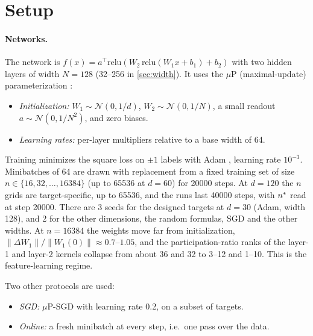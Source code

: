 \section{Setup}\label{sec:setup}

\paragraph{Networks.} The network is $f(x)=a^\top\mathrm{relu}(W_2\,\mathrm{relu}(W_1x+b_1)+b_2)$ with two hidden layers of width $N=128$ (32–256 in \cref{sec:width}). It uses the $\mu$P (maximal-update) parameterization \cite{yang2021feature}:
\begin{itemize}
\item \emph{Initialization:} $W_1\sim\mathcal N(0,1/d)$, $W_2\sim\mathcal N(0,1/N)$, a small readout $a\sim\mathcal N(0,1/N^2)$, and zero biases.
\item \emph{Learning rates:} per-layer multipliers relative to a base width of 64.
\end{itemize}
Training minimizes the square loss on $\pm1$ labels with Adam \cite{kingma2015adam}, learning rate $10^{-3}$. Minibatches of 64 are drawn with replacement from a fixed training set of size $n\in\{16,32,\dots,16384\}$ (up to 65536 at $d=60$) for 20000 steps. At $d=120$ the $n$ grids are target-specific, up to 65536, and the runs last 40000 steps, with $n^{*}$ read at step 20000. There are 3 seeds for the designed targets at $d=30$ (Adam, width 128), and 2 for the other dimensions, the random formulas, SGD and the other widths. At $n=16384$ the weights move far from initialization, $\|\Delta W_1\|/\|W_1(0)\|\approx0.7$–$1.05$, and the participation-ratio ranks of the layer-1 and layer-2 kernels collapse from about 36 and 32 to 3–12 and 1–10. This is the feature-learning regime.

Two other protocols are used:
\begin{itemize}
\item \emph{SGD:} $\mu$P-SGD with learning rate 0.2, on a subset of targets.
\item \emph{Online:} a fresh minibatch at every step, i.e.\ one pass over the data.
\end{itemize}

